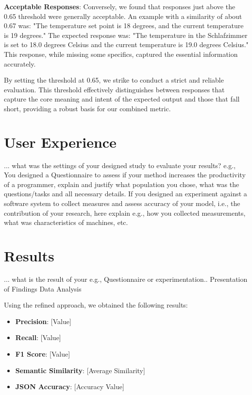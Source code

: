 \textbf{Acceptable Responses}: Conversely, we found that responses just above the 0.65 threshold were generally acceptable. An example with a similarity of about 0.67 was: "The temperature set point is 18 degrees, and the current temperature is 19 degrees." The expected response was: "The temperature in the Schlafzimmer is set to 18.0 degrees Celsius and the current temperature is 19.0 degrees Celsius." This response, while missing some specifics, captured the essential information accurately.

By setting the threshold at 0.65, we strike to conduct a strict and reliable evaluation. This threshold effectively distinguishes between responses that capture the core meaning and intent of the expected output and those that fall short, providing a robust basis for our combined metric.



\section{User Experience}

... what was the settings of your designed study to evaluate your results? e.g., You designed a Questionnaire to assess if your method increases the productivity of a programmer, explain and justify what population you chose, what was the questions/tasks and all necessary details. If you designed an experiment against a software system to collect measures and assess accuracy of your model, i.e., the contribution of your research, here explain e.g., how you collected measurements, what was characteristics of machines, etc.

% 


\section{Results}
... what is the result of your e.g., Questionnaire or experimentation.. 
Presentation of Findings
Data Analysis

Using the refined approach, we obtained the following results:
\begin{itemize}
    \item \textbf{Precision}: [Value]
    \item \textbf{Recall}: [Value]
    \item \textbf{F1 Score}: [Value]
    \item \textbf{Semantic Similarity}: [Average Similarity]
    \item \textbf{JSON Accuracy}: [Accuracy Value]
\end{itemize}

